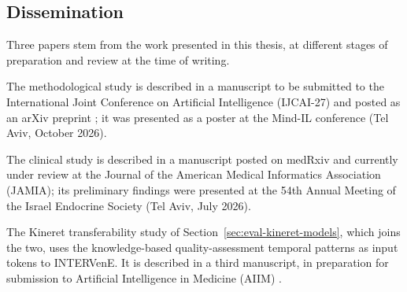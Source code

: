 \subsection{Dissemination}
\label{sec:disc-dissemination}

Three papers stem from the work presented in this thesis, at different
stages of preparation and review at the time of writing.

The methodological study is described in a manuscript to be submitted
to the International Joint Conference on Artificial Intelligence
(IJCAI-27) and posted as an arXiv preprint \citep{methodology-paper};
it was presented as a poster at the Mind-IL conference (Tel Aviv,
October 2026).

The clinical study is described in a manuscript posted on medRxiv
\citep{kineret-guidelines-paper} and currently under review at the
Journal of the American Medical Informatics Association (JAMIA);
its preliminary findings were presented at the 54th Annual Meeting of
the Israel Endocrine Society (Tel Aviv, July 2026).

The Kineret transferability study of
Section~\ref{sec:eval-kineret-models}, which joins the two, uses the
knowledge-based quality-assessment temporal patterns as input tokens to
INTERVenE. It is described in a third manuscript, in preparation for
submission to Artificial Intelligence in Medicine (AIIM)
\citep{kineret-prediction-paper}.
